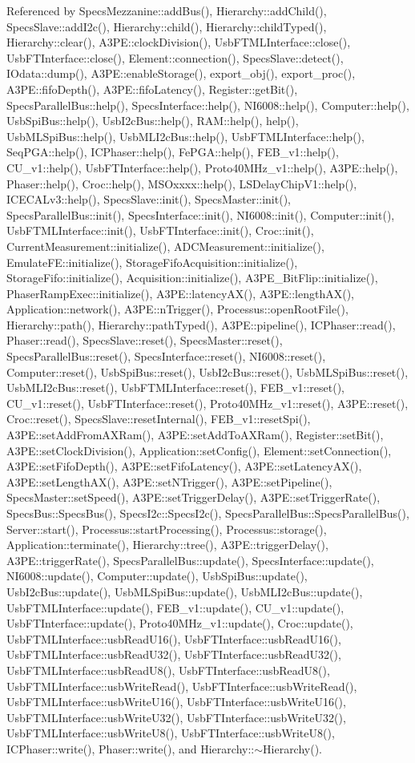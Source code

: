 Referenced by SpecsMezzanine::addBus(), Hierarchy::addChild(), SpecsSlave::addI2c(), Hierarchy::child(), Hierarchy::childTyped(), Hierarchy::clear(), A3PE::clockDivision(), UsbFTMLInterface::close(), UsbFTInterface::close(), Element::connection(), SpecsSlave::detect(), IOdata::dump(), A3PE::enableStorage(), export\_\-obj(), export\_\-proc(), A3PE::fifoDepth(), A3PE::fifoLatency(), Register::getBit(), SpecsParallelBus::help(), SpecsInterface::help(), NI6008::help(), Computer::help(), UsbSpiBus::help(), UsbI2cBus::help(), RAM::help(), help(), UsbMLSpiBus::help(), UsbMLI2cBus::help(), UsbFTMLInterface::help(), SeqPGA::help(), ICPhaser::help(), FePGA::help(), FEB\_\-v1::help(), CU\_\-v1::help(), UsbFTInterface::help(), Proto40MHz\_\-v1::help(), A3PE::help(), Phaser::help(), Croc::help(), MSOxxxx::help(), LSDelayChipV1::help(), ICECALv3::help(), SpecsSlave::init(), SpecsMaster::init(), SpecsParallelBus::init(), SpecsInterface::init(), NI6008::init(), Computer::init(), UsbFTMLInterface::init(), UsbFTInterface::init(), Croc::init(), CurrentMeasurement::initialize(), ADCMeasurement::initialize(), EmulateFE::initialize(), StorageFifoAcquisition::initialize(), StorageFifo::initialize(), Acquisition::initialize(), A3PE\_\-BitFlip::initialize(), PhaserRampExec::initialize(), A3PE::latencyAX(), A3PE::lengthAX(), Application::network(), A3PE::nTrigger(), Processus::openRootFile(), Hierarchy::path(), Hierarchy::pathTyped(), A3PE::pipeline(), ICPhaser::read(), Phaser::read(), SpecsSlave::reset(), SpecsMaster::reset(), SpecsParallelBus::reset(), SpecsInterface::reset(), NI6008::reset(), Computer::reset(), UsbSpiBus::reset(), UsbI2cBus::reset(), UsbMLSpiBus::reset(), UsbMLI2cBus::reset(), UsbFTMLInterface::reset(), FEB\_\-v1::reset(), CU\_\-v1::reset(), UsbFTInterface::reset(), Proto40MHz\_\-v1::reset(), A3PE::reset(), Croc::reset(), SpecsSlave::resetInternal(), FEB\_\-v1::resetSpi(), A3PE::setAddFromAXRam(), A3PE::setAddToAXRam(), Register::setBit(), A3PE::setClockDivision(), Application::setConfig(), Element::setConnection(), A3PE::setFifoDepth(), A3PE::setFifoLatency(), A3PE::setLatencyAX(), A3PE::setLengthAX(), A3PE::setNTrigger(), A3PE::setPipeline(), SpecsMaster::setSpeed(), A3PE::setTriggerDelay(), A3PE::setTriggerRate(), SpecsBus::SpecsBus(), SpecsI2c::SpecsI2c(), SpecsParallelBus::SpecsParallelBus(), Server::start(), Processus::startProcessing(), Processus::storage(), Application::terminate(), Hierarchy::tree(), A3PE::triggerDelay(), A3PE::triggerRate(), SpecsParallelBus::update(), SpecsInterface::update(), NI6008::update(), Computer::update(), UsbSpiBus::update(), UsbI2cBus::update(), UsbMLSpiBus::update(), UsbMLI2cBus::update(), UsbFTMLInterface::update(), FEB\_\-v1::update(), CU\_\-v1::update(), UsbFTInterface::update(), Proto40MHz\_\-v1::update(), Croc::update(), UsbFTMLInterface::usbReadU16(), UsbFTInterface::usbReadU16(), UsbFTMLInterface::usbReadU32(), UsbFTInterface::usbReadU32(), UsbFTMLInterface::usbReadU8(), UsbFTInterface::usbReadU8(), UsbFTMLInterface::usbWriteRead(), UsbFTInterface::usbWriteRead(), UsbFTMLInterface::usbWriteU16(), UsbFTInterface::usbWriteU16(), UsbFTMLInterface::usbWriteU32(), UsbFTInterface::usbWriteU32(), UsbFTMLInterface::usbWriteU8(), UsbFTInterface::usbWriteU8(), ICPhaser::write(), Phaser::write(), and Hierarchy::$\sim$Hierarchy().


